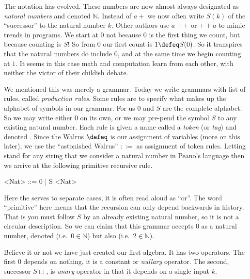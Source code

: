 The notation has evolved.  These numbers are now almost always designated as
\emph{natural numbers} and denoted $\mathbb{N}$.  Instead of $a+$ we now 
often write $S(k)$ of the ``successor'' to the natural number $k$.  Other 
authors use $a++$ or $++a$ to mimic trends in programs.  We start at
$0$ not because $0$ is the first thing we count, but because counting is $S$! So
from $0$ our first count is $1\defeq S(0)$. So it transpires that the natural
numbers do include $0$, and at the same time we begin counting at $1$.  It seems
in this case math and computation  learn from each other, with neither the victor of 
their childish debate.

We mentioned this was merely a grammar.  Today we write grammars with 
list of rules, called \emph{production rules}.  Some rules are to specify 
what makes up the alphabet of symbols in our grammar.  For us $0$ and $S$
are the complete alphabet.  So we may write either $0$ on its own, or 
we may pre-pend the symbol $S$ to any existing natural number.  
Each rule is given a name called a \emph{token} (or \emph{tag}) and 
denoted . Since the Walrus
$\defeq$ is our assignment of variables (more on this later), 
we use the ``astonished Walrus'' $::=$
as assignment of token rules. 
Letting 
 stand for any string that we consider a natural number 
in Peano's language then we arrive at the following primitive recursive rule.
\begin{center}
\begin{Gcode}[]
<Nat> ::= 0 | S <Nat>
\end{Gcode}
\end{center}
Here the \code{|} serves to separate cases, it is often read aloud as ``or''.
The word ``primitive'' here means that the recursion can only depend backwards 
in history. That is you must follow $S$ by an already existing natural number,
so it is not a circular description.
So we can claim that this grammar accepts $0$ as a natural number, denoted 
 (i.e.\ $0\in\mathbb{N}$) but also  (i.e.\ $2\in \mathbb{N}$).

Believe it or not we have just created our first algebra.  It has two 
operators.  The first $0$ depends on nothing, it is a constant or 
\emph{nullary} operator.  The second, successor $S\Box$, is \emph{unary} operator
in that it depends on a single input $k$. 


